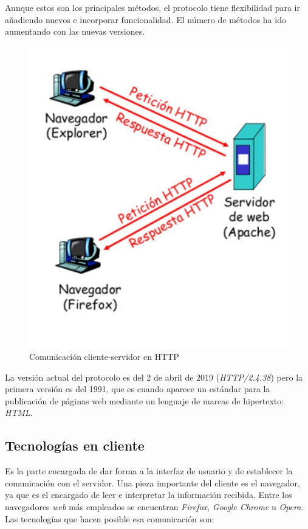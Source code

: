 Aunque estos son los principales métodos, el protocolo tiene flexibilidad para ir añadiendo nuevos e incorporar funcionalidad. El número de métodos ha ido aumentando con las nuevas versiones.
\begin{figure}[h]
\centering
\includegraphics[scale=0.4]{img/http.jpeg}
\caption{Comunicación cliente-servidor en HTTP} \label{fig:http}
\end{figure}

La versión actual del protocolo es del 2 de abril de 2019 (\textit{HTTP/2.4.38}) pero la primera versión es del 1991, que es cuando aparece un estándar para la publicación de páginas web mediante un lenguaje de marcas de hipertexto: \textit{HTML}.


\subsection{Tecnologías en cliente}
\label{subsec:tecclient}
Es la parte encargada de dar forma a la interfaz de usuario y de establecer la comunicación con el servidor. Una pieza importante del cliente es el navegador, ya que es el encargado de leer e interpretar la información recibida. Entre los navegadores \textit{web} más empleados se encuentran \textit{Firefox}, \textit{Google Chrome} u \textit{Opera}\cite{bib:navegadores}. Las tecnologías que hacen posible esa comunicación son:

